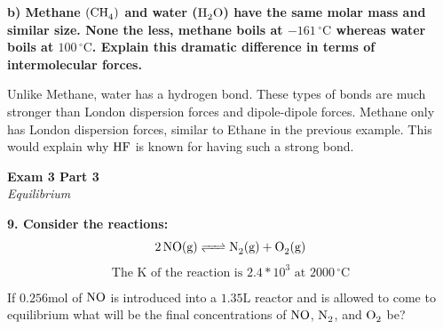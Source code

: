 \documentclass{article}
\begin{document}
    \textbf{b) Methane $(\ce{CH4})$ and water ($\ce{H2O}$) have the same molar mass and similar size. None the less, methane boils at $-161\,^{\circ}\mathrm{C}$  whereas water boils at $100\,^{\circ}\mathrm{C}$. Explain this  dramatic difference in terms of intermolecular forces.}

    Unlike Methane, water has a hydrogen bond. These types of bonds are much stronger than London dispersion forces and dipole-dipole forces. Methane only has London dispersion forces, similar to Ethane in the previous example. This would explain why $\ce{HF}$ is known for having such a strong bond.
    \pagebreak

    \begin{center}
        \textbf{Exam 3 Part 3}\\
        \textit{Equilibrium}
    \end{center}
    \textbf{9. Consider the reactions:}
    $$ \ce{2NO} (\si{\gram}) \ce{<=>} \ce{N2}(\si{\gram}) + \ce{O2}(\si{\gram})$$
    $$\text{The K of the reaction is } 2.4*10^{3} \text{ at }  2000\,^{\circ}\mathrm{C}$$

    If $0.256 \si{\mole}$ of $\ce{NO}$ is introduced into a $1.35 \si{\liter}$ reactor and is allowed to come to equilibrium what will be the final concentrations of $\ce{NO }$, $\ce{N2}$, and $\ce{O2}$ be?

    \pagebreak
\end{document}
